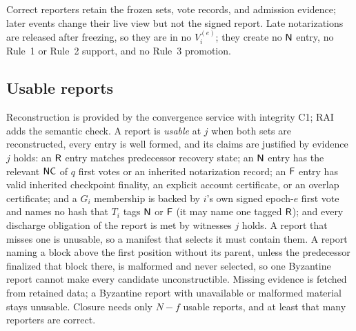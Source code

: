 Correct reporters retain the frozen sets, vote records, and admission evidence; later events change their live view but not the signed report. Late notarizations are released after freezing, so they are in no $V_i^{(e)}$; they create no $\mathsf{N}$ entry, no Rule~1 or Rule~2 support, and no Rule~3 promotion.

\subsection{Usable reports}
\label{sec:usable}
Reconstruction is provided by the convergence service with integrity C1; RAI adds the semantic check. A report is \emph{usable} at $j$ when both sets are reconstructed, every entry is well formed, and its claims are justified by evidence $j$ holds: an $\mathsf{R}$ entry matches predecessor recovery state; an $\mathsf{N}$ entry has the relevant $\mathsf{NC}$ of $q$ first votes or an inherited notarization record; an $\mathsf{F}$ entry has valid inherited checkpoint finality, an explicit account certificate, or an overlap certificate; and a $G_i$ membership is backed by $i$'s own signed epoch-$e$ first vote and names no hash that $T_i$ tags $\mathsf{N}$ or $\mathsf{F}$ (it may name one tagged $\mathsf{R}$); and every discharge obligation of the report is met by witnesses $j$ holds. A report that misses one is unusable, so a manifest that selects it must contain them. A report naming a block above the first position without its parent, unless the predecessor finalized that block there, is malformed and never selected, so one Byzantine report cannot make every candidate unconstructible. Missing evidence is fetched from retained data; a Byzantine report with unavailable or malformed material stays unusable. Closure needs only $N-f$ usable reports, and at least that many reporters are correct.

